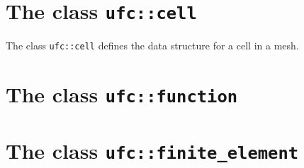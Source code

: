 
\section{The class \texttt{ufc::cell}}

The class \texttt{ufc::cell} defines the data structure for a cell in a mesh.











\section{The class \texttt{ufc::function}}







\section{The class \texttt{ufc::finite\_element}}

